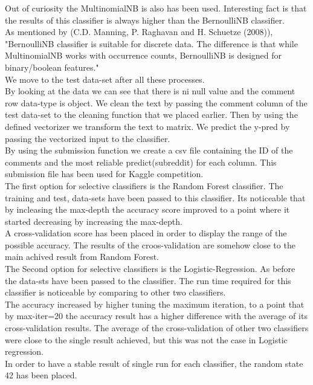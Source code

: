 \documentclass[12pt]{report}
\begin{document}
	Out of curiosity the MultinomialNB is also has been used. Interesting fact is that the results of this classifier is always higher than the BernoulliNB classifier. \\
	As mentioned by (C.D. Manning, P. Raghavan and H. Schuetze (2008)), "BernoulliNB classifier is suitable for discrete data. The difference is that while MultinomialNB works with occurrence counts, BernoulliNB is designed for binary/boolean features." \\
	We move to the test data-set after all these processes. \\
	By looking at the data we can see that there is ni null value and the comment row data-type is object.
	We clean the text by passing the comment column of the test data-set to the cleaning function that we placed earlier. Then by using the defined vectorizer we transform the text to matrix.
	We predict the y-pred by passing the vectorized input to the classifier.\\
	By using the submission function we create a csv file containing the ID of the comments and the most reliable predict(subreddit) for each column. This submission file has been used for Kaggle competition.\\
	The first option for selective classifiers is the Random Forest classifier. The training and test, data-sets have been passed to this classifier. Its noticeable that by incleasing the max-depth the accuracy score improved to a point where it started decreasing by increasing the max-depth.\\
	A cross-validation score has been placed in order to display the range of the possible accuracy. The results of the croos-validation are somehow close to the main achived result from Random Forest.\\
	The Second option for selective classifiers is the Logistic-Regression. As before the data-sts have been passed to the classifier. The run time required for this classifier is noticeable by comparing to other two classifiers. \\
	The accuracy increased by higher tuning the maximum iteration, to a point that by max-iter=20 the accuracy result has a higher difference with the average of its cross-validation results. The average of the cross-validation of other two classifiers were close to the single result achieved, but this was not the case in Logistic regression.\\
	In order to have a stable result of single run for each classifier, the random state 42 has been placed. 
	
\end{document}
